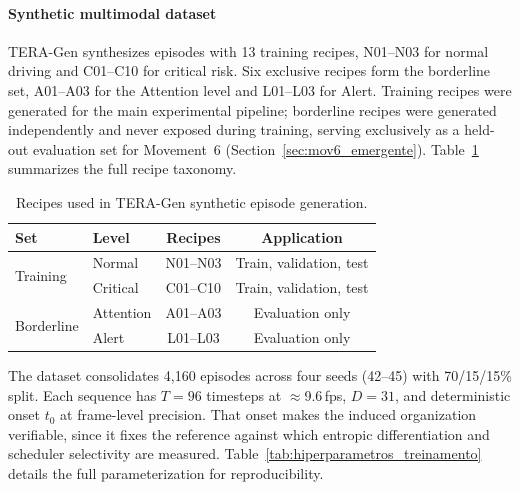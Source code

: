 \documentclass[a4paper,fleqn]{cas-dc}
\newcommand{\TERAGen}{\mbox{TERA-Gen}\xspace}
\begin{document}
\paragraph{Synthetic multimodal dataset}
\TERAGen synthesizes episodes with 13 training recipes, N01--N03 for
normal driving and C01--C10 for critical risk. Six exclusive recipes
form the borderline set, A01--A03 for the Attention level and L01--L03
for Alert. Training recipes were generated for the main experimental
pipeline; borderline recipes were generated independently and never
exposed during training, serving exclusively as a held-out evaluation
set for Movement~6 (Section~\ref{sec:mov6_emergente}).
Table~\ref{tab:receitas} summarizes the full recipe taxonomy.
\begin{table}[!tbp]
\centering
\caption{Recipes used in \mbox{TERA-Gen} synthetic episode generation.}
\label{tab:receitas}
\footnotesize
\setlength{\tabcolsep}{4pt}
\renewcommand{\arraystretch}{1.15}
\begin{tabular}{l l c c}
\toprule
\textbf{Set} & \textbf{Level}
  & \textbf{Recipes} & \textbf{Application} \\
\midrule
\multirow{2}{*}{Training} & Normal   & N01--N03 & Train, validation, test \\
                          & Critical & C01--C10 & Train, validation, test \\
\midrule
\multirow{2}{*}{Borderline} & Attention & A01--A03 & Evaluation only \\
                            & Alert     & L01--L03 & Evaluation only \\
\bottomrule
\end{tabular}
\end{table}
The dataset consolidates 4,160 episodes across four seeds (42--45) with
70/15/15\% split. Each sequence has $T=96$ timesteps at $\approx$9.6\,fps,
$D=31$, and deterministic onset $t_0$ at frame-level precision. That onset makes
the induced organization verifiable, since it fixes the reference against which
entropic differentiation and scheduler selectivity are measured.
Table~\ref{tab:hiperparametros_treinamento} details the full parameterization
for reproducibility.
\end{document}
